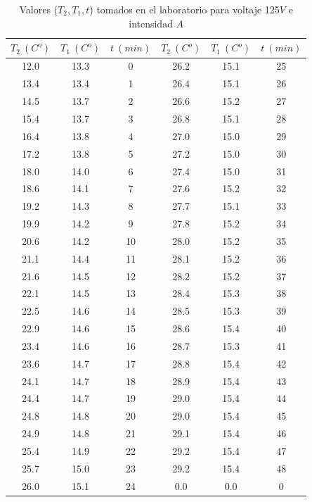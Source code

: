 \documentclass[12pt,a4paper]{article}
\begin{document}
\begin{table}[h!] 	 \centering 
\begin{tabular}{|c|c|c||c|c|c|} 
\hline 
$T_2 \ (C^o)$ & $T_1 \ (C^o) $ & $t \ (min)$ & $T_2 \ (C^o)$ & $T_1 \ (C^o) $ & $t \ (min)$ \\ \hline 
12.0 &  13.3 & 0 & 26.2 & 15.1 & 25 \\ 
13.4 &  13.4 & 1 & 26.4 & 15.1 & 26 \\ 
14.5 &  13.7 & 2 & 26.6 & 15.2 & 27 \\ 
15.4 &  13.7 & 3 & 26.8 & 15.1 & 28 \\ 
16.4 &  13.8 & 4 & 27.0 & 15.0 & 29 \\ 
17.2 &  13.8 & 5 & 27.2 & 15.0 & 30 \\ 
18.0 &  14.0 & 6 & 27.4 & 15.0 & 31 \\ 
18.6 &  14.1 & 7 & 27.6 & 15.2 & 32 \\ 
19.2 &  14.3 & 8 & 27.7 & 15.1 & 33 \\ 
19.9 &  14.2 & 9 & 27.8 & 15.2 & 34 \\ 
20.6 &  14.2 & 10 & 28.0 & 15.2 & 35 \\ 
21.1 &  14.4 & 11 & 28.1 & 15.2 & 36 \\ 
21.6 &  14.5 & 12 & 28.2 & 15.2 & 37 \\ 
22.1 &  14.5 & 13 & 28.4 & 15.3 & 38 \\ 
22.5 &  14.6 & 14 & 28.5 & 15.3 & 39 \\ 
22.9 &  14.6 & 15 & 28.6 & 15.4 & 40 \\ 
23.4 &  14.6 & 16 & 28.7 & 15.3 & 41 \\ 
23.6 &  14.7 & 17 & 28.8 & 15.4 & 42 \\ 
24.1 &  14.7 & 18 & 28.9 & 15.4 & 43 \\ 
24.4 &  14.7 & 19 & 29.0 & 15.4 & 44 \\ 
24.8 &  14.8 & 20 & 29.0 & 15.4 & 45 \\ 
24.9 &  14.8 & 21 & 29.1 & 15.4 & 46 \\ 
25.4 &  14.9 & 22 & 29.2 & 15.4 & 47 \\ 
25.7 &  15.0 & 23 & 29.2 & 15.4 & 48 \\ 
26.0 &  15.1 & 24 & 0.0 & 0.0 & 0 \\ 
\hline 
\end{tabular} 
\caption{Valores ($T_2,T_1,t$) tomados en el laboratorio para voltaje 125$V$ e intensidad $A$} 
\label{tab:} 
\end{table} 

\newpage
\end{document}
